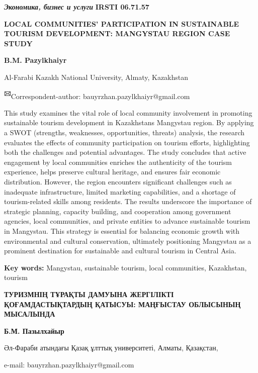 \emph{{\bfseries Экономика, бизнес и услуги}}\newpage
{\bfseries IRSTI 06.71.57}

{\bfseries LOCAL COMMUNITIES' PARTICIPATION IN SUSTAINABLE TOURISM
DEVELOPMENT: MANGYSTAU REGION CASE STUDY}

{\bfseries B.M. Pazylkhaiyr}

Al-Farabi Kazakh National University, Almaty, Kazakhstan

{\bfseries \textsuperscript{🖂}}Correspondent-author:
bauyrzhan.pazylkhaiyr@gmail.com

This study examines the vital role of local community involvement in
promoting sustainable tourism development in
Kazakhstan\textquotesingle s Mangystau region. By applying a SWOT
(strengths, weaknesses, opportunities, threats) analysis, the research
evaluates the effects of community participation on tourism efforts,
highlighting both the challenges and potential advantages. The study
concludes that active engagement by local communities enriches the
authenticity of the tourism experience, helps preserve cultural
heritage, and ensures fair economic distribution. However, the region
encounters significant challenges such as inadequate infrastructure,
limited marketing capabilities, and a shortage of tourism-related skills
among residents. The results underscore the importance of strategic
planning, capacity building, and cooperation among government agencies,
local communities, and private entities to advance sustainable tourism
in Mangystau. This strategy is essential for balancing economic growth
with environmental and cultural conservation, ultimately positioning
Mangystau as a prominent destination for sustainable and cultural
tourism in Central Asia.

{\bfseries Key words:} Mangystau, sustainable tourism, local communities,
Kazakhstan, tourism

{\bfseries ТУРИЗМНІҢ ТҰРАҚТЫ ДАМУЫНА ЖЕРГІЛІКТІ ҚОҒАМДАСТЫҚТАРДЫҢ ҚАТЫСУЫ:
МАҢҒЫСТАУ ОБЛЫСЫНЫҢ МЫСАЛЫНДА}

{\bfseries Б.М. Пазылхайыр}

Әл-Фараби атындағы Қазақ ұлттық университеті, Алматы, Қазақстан,

e-mail: bauyrzhan.pazylkhaiyr@gmail.com

